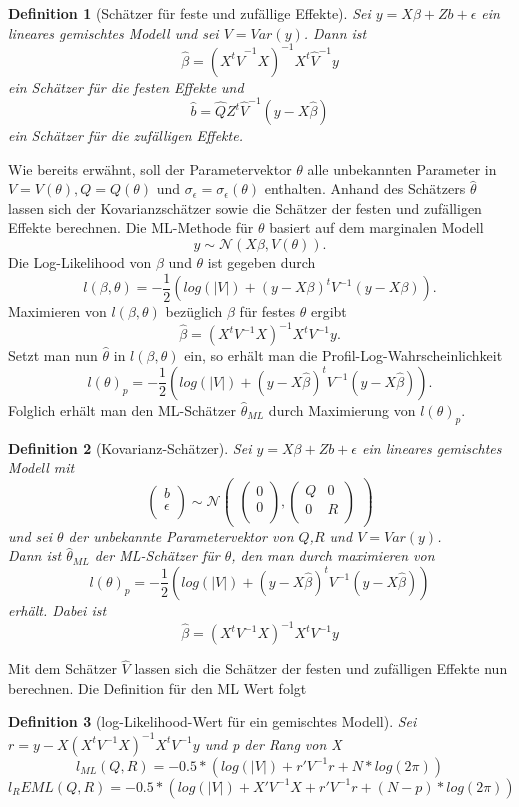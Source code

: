 \documentclass[%
thesis=student,%
coverpage=false,%
titlepage=false,%
headmarks=true, %
german,%
font=libertine, %
math=newpxtx, %
BCOR=5mm,%
coverBCOR=11mm%
]{tumbook}
\theoremstyle{break}
\newtheorem{definition}{Definition}[section]
\begin{document}
\begin{definition}[Schätzer für feste und zufällige Effekte]
	Sei $y = X\beta + Zb + \epsilon$ ein lineares gemischtes Modell und sei $V = Var(y)$.
	Dann ist $$\hat{\beta} = (X^t \hat{V}^{-1}X)^{-1}X^t \hat{V}^{-1}y$$ ein Schätzer für die festen Effekte und $$ \hat{b} = \hat{Q} Z^t\hat{V}^{-1}(y-X\hat{\beta})$$ ein Schätzer für die zufälligen Effekte.
\end{definition}\noindent
Wie bereits erwähnt, soll der Parametervektor $\theta$ alle unbekannten Parameter in $V= V(\theta), Q = Q(\theta)$ und $\sigma_\epsilon = \sigma_\epsilon(\theta)$ enthalten. Anhand des Schätzers $\hat{\theta}$  lassen sich der Kovarianzschätzer sowie die Schätzer der festen und zufälligen Effekte berechnen. 
Die ML-Methode für $\theta$ basiert auf dem marginalen Modell 
$$y \sim \mathcal{N}(X\beta,V(\theta)).$$
Die Log-Likelihood von $\beta$ und $\theta$ ist gegeben durch
$$l(\beta,\theta) = - \frac{1}{2} (log(|V|)+(y-X\beta)^tV^{-1}(y-X\beta)).$$
Maximieren von $l(\beta,\theta)$ bezüglich $\beta$ für festes $\theta$ ergibt 
$$ \hat{\beta} = (X^tV^{-1}X)^{-1}X^tV^{-1}y.$$
Setzt man nun $\hat{\theta}$ in $l(\beta,\theta)$ ein, so erhält man die Profil-Log-Wahrscheinlichkeit 
$$ l(\theta)_p = - \frac{1}{2} (log(|V|)+(y-X\hat{\beta})^tV^{-1}(y-X\hat{\beta})).$$
Folglich erhält man den ML-Schätzer $\hat{\theta}_{ML}$ durch Maximierung von $l(\theta)_p$. 
\begin{definition}[Kovarianz-Schätzer]
	Sei $y = X\beta + Zb + \epsilon $ ein lineares gemischtes Modell mit $$\begin{pmatrix}
		b \\
		\epsilon \\
	\end{pmatrix}
	\sim
	\mathcal{N}
	\begin{pmatrix}
		\begin{pmatrix}
			
			0 \\
			0 \\
		\end{pmatrix},
		\begin{pmatrix}
			Q & 0 \\
			0 & R \\
		\end{pmatrix}
	\end{pmatrix}$$ und sei $\theta$ der unbekannte Parametervektor von $Q$,$R$ und $V=Var(y)$. \\
	Dann ist $\hat{\theta}_{ML}$ der ML-Schätzer für $\theta$, den man durch maximieren von $$  l(\theta)_p = - \frac{1}{2} (log(|V|)+(y-X\hat{\beta})^tV^{-1}(y-X\hat{\beta})) $$erhält.
	Dabei ist $$ \hat{\beta} = (X^tV^{-1}X)^{-1}X^tV^{-1}y$$
\end{definition} \noindent
Mit dem Schätzer $\hat{V}$ lassen sich die Schätzer der festen und zufälligen Effekte nun berechnen.
Die Definition für den ML Wert folgt 
\begin{definition}[log-Likelihood-Wert für ein gemischtes Modell]
	Sei $r = y - X(X^tV^{-1}X)^{-1}X^tV^{-1}y$ und p der Rang von X
	$$ l_{ML}(Q,R) = -0.5 * (log(|V|)+ r'V^{-1}r + N * log(2\pi))$$
	$$l_REML(Q,R) = -0.5 * (log(|V|)+ X'V^{-1}X + r'V^{-1}r+ (N-p) * log(2\pi))$$
\end{definition}\noindent
\
\end{document}
